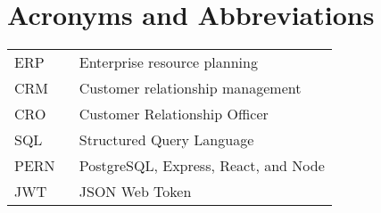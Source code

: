 \chapter*{Acronyms and Abbreviations}

\begin{flushleft}
    \begin{tabular}{l p{0.8\linewidth}}
        ERP  & Enterprise resource planning \cite{erp}          \\
        CRM  & Customer relationship management \cite{crm}      \\
        CRO  & Customer Relationship Officer                    \\
        SQL  & Structured Query Language                        \\
        PERN & PostgreSQL, Express, React, and Node \cite{pern} \\
        JWT  & JSON Web Token \cite{jwt}                        \\
    \end{tabular}
\end{flushleft}


